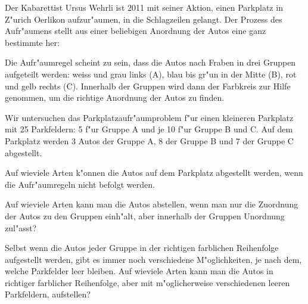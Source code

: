 Der Kabarettist Ursus Wehrli ist 2011 mit seiner Aktion,
einen Parkplatz in Z"urich Oerlikon aufzur"aumen, in die Schlagzeilen
gelangt.
Der Prozess des Aufr"aumens stellt aus einer beliebigen Anordnung der
Autos eine ganz bestimmte her:
\begin{center}
\end{center}
Die Aufr"aumregel scheint zu sein, dass die Autos nach Fraben in drei Gruppen
aufgeteilt werden: weiss und grau links (A),
blau bis gr"un in der Mitte (B), rot und gelb rechts (C). Innerhalb der Gruppen
wird dann der Farbkreis zur Hilfe genommen, um die richtige Anordnung
der Autos zu finden.

Wir untersuchen das Parkplatzaufr"aumproblem f"ur einen kleineren
Parkplatz mit 25 Parkfeldern: 5 f"ur Gruppe A und je 10 f"ur Gruppe B und C.
Auf dem Parkplatz werden 3 Autos der Gruppe A, 8 der Gruppe B und 7 der
Gruppe C abgestellt.
\begin{teilaufgaben}
\item Auf wieviele Arten k"onnen die Autos auf dem Parkplatz abgestellt
werden, wenn die Aufr"aumregeln nicht befolgt werden.
\item Auf wieviele Arten kann man die Autos abstellen, wenn man nur
die Zuordnung der Autos zu den Gruppen einh"alt, aber innerhalb 
der Gruppen Unordnung zul"asst?
\item Selbst wenn die Autos jeder Gruppe in der richtigen farblichen
Reihenfolge aufgestellt werden, gibt es immer noch verschiedene
M"oglichkeiten, je nach dem, welche Parkfelder leer bleiben. Auf
wieviele Arten kann man die Autos in richtiger farblicher Reihenfolge,
aber mit m"oglicherweise verschiedenen leeren Parkfeldern, aufstellen?
\end{teilaufgaben}

